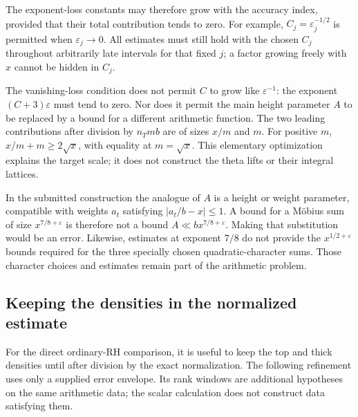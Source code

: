 The exponent-loss constants may therefore grow with the accuracy
index, provided that their total contribution tends to zero.
For example, $C_j=\varepsilon_j^{-1/2}$ is permitted when
$\varepsilon_j\to0$. All estimates must still hold with the
chosen $C_j$ throughout arbitrarily late intervals for that fixed
$j$; a factor growing freely with $x$ cannot be hidden in $C_j$.

The vanishing-loss condition does not permit $C$ to grow like
$\varepsilon^{-1}$: the exponent $(C+3)\varepsilon$ must tend to
zero. Nor does it permit the main height parameter $A$ to be replaced
by a bound for a different arithmetic function. The two leading
contributions after division by $n_Tmb$ are of sizes $x/m$ and $m$.
For positive $m$, $x/m+m\ge2\sqrt{x}$, with equality at
$m=\sqrt{x}$. This elementary optimization explains the target
scale; it does not construct the theta lifts or their integral
lattices.

In the submitted construction the analogue of $A$ is a height or
weight parameter, compatible with weights $a_t$ satisfying
$|a_t/b-x|\le1$. A bound for a M\"obius sum of size
$x^{7/8+\varepsilon}$ is therefore not a bound
$A\ll b x^{7/8+\varepsilon}$. Making that substitution would be
an error. Likewise, estimates at exponent $7/8$ do not provide the
$x^{1/2+\varepsilon}$ bounds required for the three specially
chosen quadratic-character sums. Those character choices and
estimates remain part of the arithmetic problem.

\subsection{Keeping the densities in the normalized estimate}

For the direct ordinary-RH comparison, it is useful to keep the top
and thick densities until after division by the exact normalization.
The following refinement uses only a supplied error envelope. Its
rank windows are additional hypotheses on the same arithmetic data;
the scalar calculation does not construct data satisfying them.

